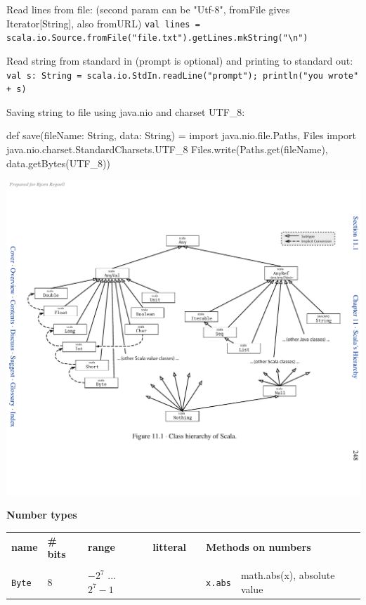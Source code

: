 \documentclass[article, a5paper]{memoir}
\newcommand{\LangColor}{red}
\newcommand{\head}[1]{{\bfseries {\color{\LangColor}{#1}}\par\vspace{1mm}\hrule\vspace{-2mm}}}
\renewcommand{\arraystretch}{0.9}
\newcommand{\code}{\lstinline[basicstyle=\ttfamily]}
\newcommand{\Newline}{\vspace{\baselineskip}}
\begin{document}
{\Newline\head{Reading/writing from file and standard in/out:}\Newline
{\small
Read lines from file: (second param can be "Utf-8", fromFile gives Iterator[String], also fromURL)
\code|val lines = scala.io.Source.fromFile("file.txt").getLines.mkString("\n")| 
}


{\small
\vspace{0.5em}Read string from standard in (prompt is optional) and printing to standard out:
\code|val s: String = scala.io.StdIn.readLine("prompt"); println("you wrote" + s)|

\vspace{0.5em}Saving string to file using java.nio and charset UTF\_8:\vspace{-0.5em}
\begin{Code}
def save(fileName: String, data: String) = {
    import java.nio.file.{Paths, Files}
    import java.nio.charset.StandardCharsets.UTF_8
    Files.write(Paths.get(fileName), data.getBytes(UTF_8))
}
\end{Code}
}



\clearpage
\Newline\head{The Scala Type System}%
\includegraphics[width=1.07\textwidth,trim=12mm 0 0 0cm]{../img/hierarchy.pdf}

{\small \renewcommand{\arraystretch}{1.1}
\textbf{Number types}\\
\begin{tabular}{@{}l l l l p{2mm} | l l}
\textbf{name} & \textbf{\# bits} & \textbf{range} & \textbf{litteral} &   & \multicolumn{2}{l}{\textbf{Methods on numbers}}\\ \cline{1-4}%
& & & &\\[-1em]
\texttt{Byte}   &  8  & $-2^7$ ... $2^7-1$  & &  
& \code|x.abs| & math.abs(x), absolute value\\


\end{tabular}}}
\end{document}
